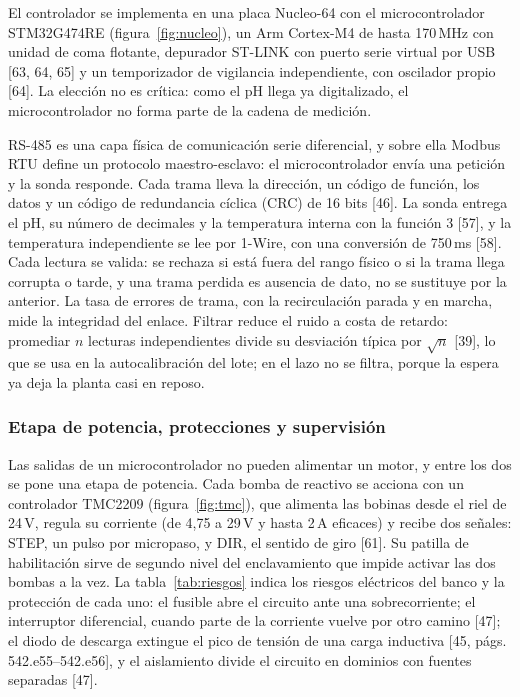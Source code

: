El controlador se implementa en una placa Nucleo-64 con el microcontrolador STM32G474RE (figura~\ref{fig:nucleo}), un Arm Cortex-M4 de hasta 170\,MHz con unidad de coma flotante, depurador ST-LINK con puerto serie virtual por USB [63, 64, 65] y un temporizador de vigilancia independiente, con oscilador propio [64]. La elección no es crítica: como el pH llega ya digitalizado, el microcontrolador no forma parte de la cadena de medición.

RS-485 es una capa física de comunicación serie diferencial, y sobre ella Modbus RTU define un protocolo maestro-esclavo: el microcontrolador envía una petición y la sonda responde. Cada trama lleva la dirección, un código de función, los datos y un código de redundancia cíclica (CRC) de 16 bits [46]. La sonda entrega el pH, su número de decimales y la temperatura interna con la función 3 [57], y la temperatura independiente se lee por 1-Wire, con una conversión de 750\,ms [58]. Cada lectura se valida: se rechaza si está fuera del rango físico o si la trama llega corrupta o tarde, y una trama perdida es ausencia de dato, no se sustituye por la anterior. La tasa de errores de trama, con la recirculación parada y en marcha, mide la integridad del enlace. Filtrar reduce el ruido a costa de retardo: promediar $n$ lecturas independientes divide su desviación típica por $\sqrt{n}$ [39], lo que se usa en la autocalibración del lote; en el lazo no se filtra, porque la espera ya deja la planta casi en reposo.

\begin{figure}[H]\centering
{}\hspace{10mm}
\end{figure}

\subsubsection{Etapa de potencia, protecciones y supervisión}\label{sec:potencia}
Las salidas de un microcontrolador no pueden alimentar un motor, y entre los dos se pone una etapa de potencia. Cada bomba de reactivo se acciona con un controlador TMC2209 (figura~\ref{fig:tmc}), que alimenta las bobinas desde el riel de 24\,V, regula su corriente (de 4,75 a 29\,V y hasta 2\,A eficaces) y recibe dos señales: STEP, un pulso por micropaso, y DIR, el sentido de giro [61]. Su patilla de habilitación sirve de segundo nivel del enclavamiento que impide activar las dos bombas a la vez. La tabla~\ref{tab:riesgos} indica los riesgos eléctricos del banco y la protección de cada uno: el fusible abre el circuito ante una sobrecorriente; el interruptor diferencial, cuando parte de la corriente vuelve por otro camino [47]; el diodo de descarga extingue el pico de tensión de una carga inductiva [45, págs. 542.e55–542.e56], y el aislamiento divide el circuito en dominios con fuentes separadas [47].


